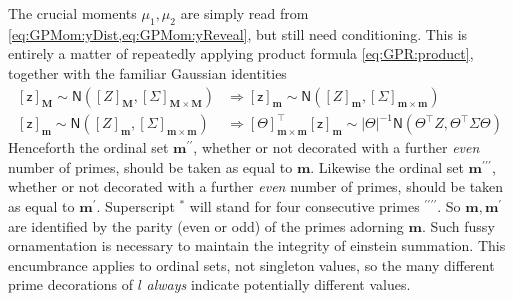 \documentclass[preprint,12pt]{elsarticle}
\newcommand*{\M}[1]{\ensuremath{#1}\xspace}
\newcommand*{\x}{\times}
\newcommand*{\mi}[1]{\mathbf{#1}}
\newcommand*{\rv}[1]{\mathsf{#1}}
\newcommand*{\te}[2][]{\left\lbrack{#2}\right\rbrack_{#1}}
\newcommand*{\gauss}[2]{\mathsf{N}\!\left({#1,#2}\right)}
\newcommand*{\modulus}[1]{\M{\left\lvert{#1}\right\rvert}}
\begin{document}
    The crucial moments $\mu_{1},\mu_{2}$ are simply read from \cref{eq:GPMom:yDist,eq:GPMom:yReveal}, but still need conditioning. This is entirely a matter of repeatedly applying product formula \cref{eq:GPR:product}, together with the familiar Gaussian identities
    \begin{equation*}
        \begin{aligned}
            \te[\mi{M}]{\rv{z}} \sim \gauss{\te[\mi{M}]{Z}}{\te[\mi{M}\x\mi{M}]{\Sigma}} &\Rightarrow
            \te[\mi{m}]{\rv{z}} \sim \gauss{\te[\mi{m}]{Z}}{\te[\mi{m}\x\mi{m}]{\Sigma}} \\
            \te[\mi{m}]{\rv{z}} \sim \gauss{\te[\mi{m}]{Z}}{\te[\mi{m}\x\mi{m}]{\Sigma}} &\Rightarrow
            \te[\mi{m}\x\mi{m}]{\Theta}^{\intercal}\te[\mi{m}]{\rv{z}} \sim 
            \modulus{\Theta}^{-1}
            \gauss{\Theta^{\intercal}Z}{\Theta^{\intercal}\Sigma\Theta}                        
        \end{aligned}
    \end{equation*}
    Henceforth the ordinal set $\mi{m^{\prime\prime}}$, whether or not decorated with a further \emph{even} number of primes, should be taken as equal to $\mi{m}$. 
    Likewise the ordinal set $\mi{m^{\prime\prime\prime}}$, whether or not decorated with a further \emph{even} number of primes, should be taken as equal to $\mi{m^{\prime}}$. Superscript $^{*}$ will stand for four consecutive primes $^{\prime\prime\prime\prime}$. So $\mi{m}, \mi{m^{\prime}}$ are identified by the parity (even or odd) of the primes adorning $\mi{m}$. Such fussy ornamentation is necessary to maintain the integrity of einstein summation. This encumbrance applies to ordinal sets, not singleton values, so the many different prime decorations of $l$ \emph{always} indicate potentially different values.
\end{document}
